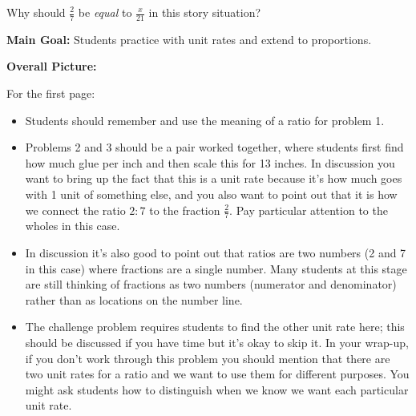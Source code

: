 \documentclass[nooutcomes,noauthor,handout]{ximera}
\begin{document}
\begin{problem}
Why should $\frac{2}{7}$ be {\em equal} to $\frac{x}{21}$ in this story situation?
\end{problem}














\newpage
\begin{instructorNotes}

{\bf Main Goal:} Students practice with unit rates and extend to proportions.

{\bf Overall Picture:}

For the first page:
\begin{itemize}
	\item Students should remember and use the meaning of a ratio for problem 1. 
	\item Problems 2 and 3 should be a pair worked together, where students first find how much glue per inch and then scale this for 13 inches. In discussion you want to bring up the fact that this is a unit rate because it's how much goes with 1 unit of something else, and you also want to point out that it is how we connect the ratio $2:7$ to the fraction $\frac{2}{7}$. Pay particular attention to the wholes in this case.
	\item In discussion it's also good to point out that ratios are two numbers (2 and 7 in this case) where fractions are a single number. Many students at this stage are still thinking of fractions as two numbers (numerator and denominator) rather than as locations on the number line.
	\item The challenge problem requires students to find the other unit rate here; this should be discussed if you have time but it's okay to skip it. In your wrap-up, if you don't work through this problem you should mention that there are two unit rates for a ratio and we want to use them for different purposes. You might ask students how to distinguish when we know we want each particular unit rate.
\end{itemize}


\end{instructorNotes}
\end{document}
